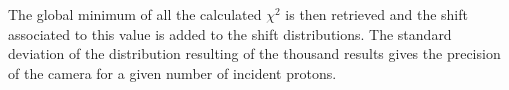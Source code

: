 
The global minimum of all the calculated $\chi^2$ is then retrieved and the shift associated to this value is added to the shift distributions. %
The standard deviation of the distribution resulting of the thousand results gives the precision of the camera for a given number of incident protons. 



